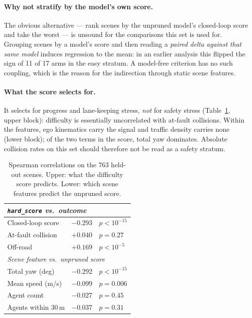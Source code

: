 \paragraph{Why not stratify by the model's own score.}
The obvious alternative --- rank scenes by the unpruned model's closed-loop score and take
the worst --- is unsound for the comparisons this set is used for. Grouping scenes by a
model's score and then reading a \emph{paired delta against that same model} induces
regression to the mean: in an earlier analysis this flipped the sign of 11 of 17 arms in
the easy stratum. A model-free criterion has no such coupling, which is the reason for the
indirection through static scene features.

\paragraph{What the score selects for.}
It selects for progress and lane-keeping stress, \emph{not} for safety stress
(Table~\ref{tab:hard100-what}, upper block): difficulty is essentially uncorrelated with
at-fault collisions. Within the features, ego kinematics carry the signal and traffic
density carries none (lower block); of the two terms in the score, total yaw dominates.
Absolute collision rates on this set should therefore not be read as a safety stratum.

\begin{table}[t]
\centering\small
\caption{Spearman correlations on the 763 held-out scenes. Upper: what the
  difficulty score predicts. Lower: which scene features predict the unpruned score.}
\label{tab:hard100-what}
\begin{tabular}{lrl}
\toprule
\multicolumn{3}{l}{\emph{\texttt{hard\_score} vs.\ outcome}} \\
\midrule
    Closed-loop score & $-0.293$ & $p<10^{-15}$ \\
    At-fault collision & $+0.040$ & $p=0.27$ \\
    Off-road & $+0.169$ & $p<10^{-5}$ \\
\midrule
\multicolumn{3}{l}{\emph{Scene feature vs.\ unpruned score}} \\
\midrule
    Total yaw (deg) & $-0.292$ & $p<10^{-15}$ \\
    Mean speed (m/s) & $-0.099$ & $p=0.006$ \\
    Agent count & $-0.027$ & $p=0.45$ \\
    Agents within 30\,m & $-0.037$ & $p=0.31$ \\
\bottomrule
\end{tabular}
\end{table}

